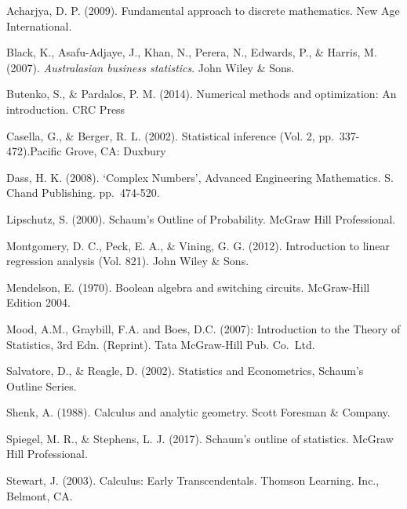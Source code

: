 \documentclass[]{book}
\begin{document}
Acharjya, D. P. (2009). Fundamental approach to discrete mathematics. New Age International.

Black, K., Asafu-Adjaye, J., Khan, N., Perera, N., Edwards, P., \& Harris, M. (2007). \emph{Australasian business statistics}. John Wiley \& Sons.

Butenko, S., \& Pardalos, P. M. (2014). Numerical methods and optimization: An introduction. CRC Press

Casella, G., \& Berger, R. L. (2002). Statistical inference (Vol. 2, pp.~337-472).Pacific Grove, CA: Duxbury

Dass, H. K. (2008). `Complex Numbers', Advanced Engineering Mathematics. S. Chand Publishing. pp.~474-520.

Lipschutz, S. (2000). Schaum's Outline of Probability. McGraw Hill Professional.

Montgomery, D. C., Peck, E. A., \& Vining, G. G. (2012). Introduction to linear regression analysis (Vol. 821). John Wiley \& Sons.

Mendelson, E. (1970). Boolean algebra and switching circuits. McGraw-Hill Edition 2004.

Mood, A.M., Graybill, F.A. and Boes, D.C. (2007): Introduction to the Theory of Statistics, 3rd Edn. (Reprint). Tata McGraw-Hill Pub. Co.~Ltd.

Salvatore, D., \& Reagle, D. (2002). Statistics and Econometrics, Schaum's Outline Series.

Shenk, A. (1988). Calculus and analytic geometry. Scott Foresman \& Company.

Spiegel, M. R., \& Stephens, L. J. (2017). Schaum's outline of statistics. McGraw Hill Professional.

Stewart, J. (2003). Calculus: Early Transcendentals. Thomson Learning. Inc., Belmont, CA.


\end{document}
